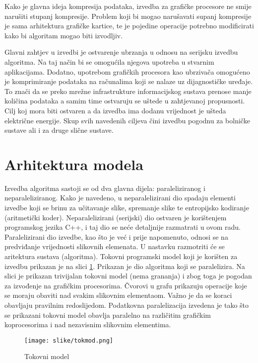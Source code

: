 \documentclass[times, utf8, zavrsni, numeric, sort]{fer}
\begin{document}
Kako je glavna ideja kompresija podataka, izvedba za grafičke procesore ne smije narušiti stupanj kompresije. Problem koji bi mogao narušavati supanj kompresije je sama arhitektura grafičke kartice, te je pojedine operacije potrebno modificirati kako bi algoritam mogao biti izvodljiv.

Glavni zahtjev u izvedbi je ostvarenje ubrzanja u odnosu na serijsku izvedbu algoritma. Na taj način bi se omogućila njegova upotreba u stvarnim aplikacijama. Dodatno, upotrebom grafičkih procesora kao ubrzivača omogućeno je komprimiranje podataka na računalima koji se nalaze uz dijagnostičke uređaje. To znači da se preko mrežne infrastrukture informacijskog sustava prenose manje količina podataka a samim time ostvaruju se uštede u zahtjevanoj propusnosti. Cilj koj mora biti ostvaren a da izvedba ima dodanu vrijednost je ušteda električne energije. Skup svih navedenih ciljeva čini izvedbu pogodnu za bolničke sustave ali i za druge slične sustave.


\section{Arhitektura modela}
Izvedba algoritma sastoji se od dva glavna dijela: paraleliziranog i neparaleliziranog. Kako je navedeno, u neparalelizirani dio spadaju elementi izvedbe koji se brinu za učitavanje slike, spremanje slike te entropijsko kodiranje (aritmetički koder). Neparalelizirani (serijski) dio  ostvaren je korištenjem programskog jezika C++, i taj dio se neće detaljnije razmatrati u ovom radu. Paralelizirani dio izvedbe, kao što je već i prije napomenuto, odnosi se na predviđanje vrijednosti slikovnih elemenata. U nastavku razmotriti će se aritektura sustava (algoritma). Tokovni programski model koji je korišten za izvedbu prikazan je na slici \ref{fig:tokmod}. Prikazan je dio algoritma koji se paralelizira. Na slici je prikazan trivijalan tokovni model (nema grananja) i zbog toga je pogodan za izvođenje na grafičkim procesorima. Čvorovi u grafu prikazuju operacije koje se moraju obaviti nad svakim slikovnim elementaom. Važno je da se koraci obavljaju pravilnim redoslijedom. Podatkovna paralelizacija izvedena je tako što se prikazani tokovni model obavlja paralelno na različitim grafičkim koprocesorima i nad nezavisnim slikovnim elementima.

\begin{figure}[htb]
\centering
\texttt{[image: slike/tokmod.png]}
\caption{Tokovni model}
\label{fig:tokmod}
\end{figure}
\end{document}
